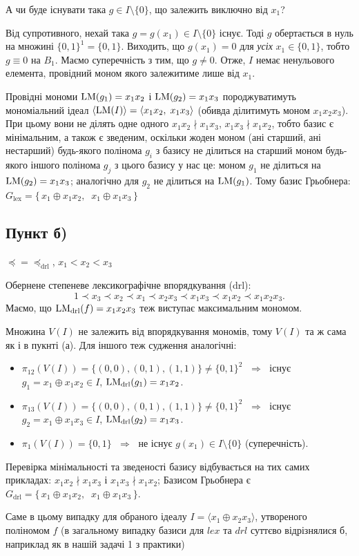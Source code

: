\noindent А чи буде існувати така $g \in I \setminus \{0\}$, що залежить виключно від $x_1$?

Від супротивного, нехай така $g = g(x_1) \in I \setminus \{0\}$ існує. Тоді $g$ обертається в нуль на множині 
$\{0, 1\}^{1} = \{0,1\}$. Виходить, що $g(x_1) = 0$ для \emph{усіх} $x_1 \in \{0,1\}$, тобто $g \equiv 0$ на $B_1$. 
Маємо суперечність з тим, що $g \neq 0$. Отже, $I$ немає ненульового елемента, провідний моном якого залежитиме 
лише від $x_1$.

Провідні мономи $\mathrm{LM}(g_1) = x_1 x_2$ і $\mathrm{LM}(g_2) = x_1 x_3$ породжуватимуть мономіальний ідеал 
$\langle \mathrm{LM}(I) \rangle = \langle x_1 x_2,\; x_1 x_3 \rangle$ (обивда ділитимуть моном $x_1 x_2 x_3$). При цьому 
вони не ділять одне одного $x_1 x_2 \nmid x_1 x_3$, $x_1 x_3 \nmid x_1 x_2$, тобто базис є мінімальним, а також є 
зведеним, оскільки жоден моном (ані старший, ані нестарший) будь-якого полінома $g_i$ з базису не ділиться 
на старший моном будь-якого іншого полінома $g_j$ з цього базису у нас це: моном $g_1$ не ділиться на 
$\mathrm{LM}(g_2) = x_1 x_3$; аналогічно для $g_2$ не ділиться на $\mathrm{LM}(g_1)$.
Тому базис Грьобнера: $G_{\mathrm{lex}} = \big\{\, x_1 \oplus x_1 x_2,\;\; x_1 \oplus x_1 x_3 \,\big\}$

\subsection{Пункт б)}
$\preceq = \preceq_{\mathrm{drl}}$, $x_1 < x_2 < x_3$

Обернене степеневе лексикографічне впорядкування (drl):
\begin{equation*}
    1 \prec x_3 \prec x_2 \prec x_1 \prec x_2 x_3 \prec x_1 x_3 \prec x_1 x_2 \prec x_1 x_2 x_3.
\end{equation*}
Маємо, що $\mathrm{LM}_{\mathrm{drl}}(f) = x_1 x_2 x_3$ теж виступає максимальним мономом.

Множина $V(I)$ не залежить від впорядкування мономів, тому $V(I)$ та ж сама як і в пукнті (а).
Для іншого теж судження аналогічні:

\begin{itemize}[leftmargin=2em]
    \item $\pi_{12}(V(I)) = \{(0,0),(0,1),(1,1)\} \neq \{0,1\}^2$ $\;\Longrightarrow\;$
        існує $g_1 = x_1 \oplus x_1 x_2 \in I$, $\mathrm{LM}_{\mathrm{drl}}(g_1) = x_1 x_2$.
    \item $\pi_{13}(V(I)) = \{(0,0),(0,1),(1,1)\} \neq \{0,1\}^2$ $\;\Longrightarrow\;$
        існує $g_2 = x_1 \oplus x_1 x_3 \in I$, $\mathrm{LM}_{\mathrm{drl}}(g_2) = x_1 x_3$.
    \item $\pi_1(V(I)) = \{0,1\}$ $\;\Longrightarrow\;$ не існує $g(x_1) \in I \setminus \{0\}$ (суперечність).
\end{itemize}

Перевірка мінімальності та зведеності базису відбувається на тих самих прикладах: $x_1 x_2 \nmid x_1 x_3$ і 
$x_1 x_3 \nmid x_1 x_2$; Базисом Грьобнера є $G_{\mathrm{drl}} = \big\{\, x_1 \oplus x_1 x_2,\;\; x_1 \oplus x_1 x_3 \,\big\}$.

Саме в цьому випадку для обраного ідеалу $I = \langle x_1 \oplus x_2x_3 \rangle$, утвореного поліномом $f$ 
(в загальному випадку базиси для $lex$ та $drl$ суттєво відрізнялися б, наприклад як в нашій задачі 1 з практики)
